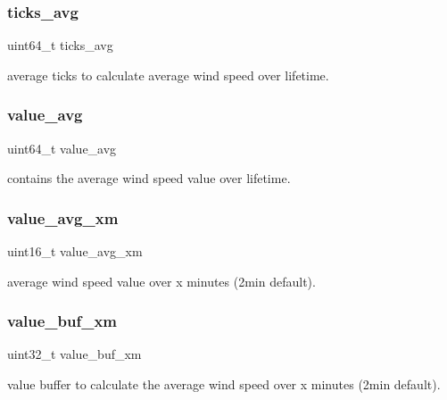 \subsubsection{\texorpdfstring{ticks\_avg}{ticks\_avg}}
{\footnotesize\ttfamily uint64\+\_\+t ticks\+\_\+avg}

average ticks to calculate average wind speed over lifetime. \mbox{\label{structanemometer__ext__t_a4ef73c3a40c5b903c435f93ea8ef5f40}} 
\subsubsection{\texorpdfstring{value\_avg}{value\_avg}}
{\footnotesize\ttfamily uint64\+\_\+t value\+\_\+avg}

contains the average wind speed value over lifetime. \mbox{\label{structanemometer__ext__t_a14f62f52081e0c30229f16da4d998d65}} 
\subsubsection{\texorpdfstring{value\_avg\_xm}{value\_avg\_xm}}
{\footnotesize\ttfamily uint16\+\_\+t value\+\_\+avg\+\_\+xm}

average wind speed value over x minutes (2min default). \mbox{\label{structanemometer__ext__t_ab852894a9785a6e785dc6931927337ff}} 
\subsubsection{\texorpdfstring{value\_buf\_xm}{value\_buf\_xm}}
{\footnotesize\ttfamily uint32\+\_\+t value\+\_\+buf\+\_\+xm}

value buffer to calculate the average wind speed over x minutes (2min default). \mbox{\label{structanemometer__ext__t_a9314254f1bd3f1a5b1512a52470aa8b3}} 
